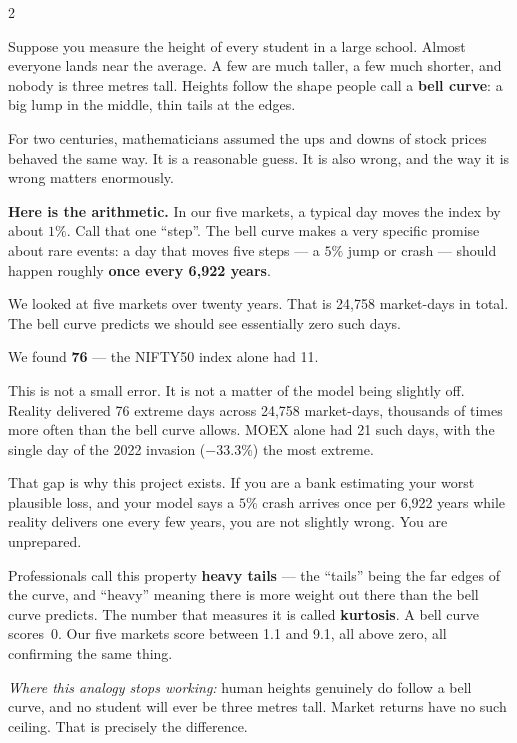 \documentclass[10pt]{article}
\newcommand{\redbox}[2]{\begin{tcolorbox}[mybox={DRed}{RBg},title={#1}]#2\end{tcolorbox}}
\begin{document}
\begin{multicols}{2}

\redbox{3\quad The Bell Curve Fails}{%
Suppose you measure the height of every student in a large school. Almost everyone lands near the average. A few are much taller, a few much shorter, and nobody is three metres tall. Heights follow the shape people call a \textbf{bell curve}: a big lump in the middle, thin tails at the edges.

For two centuries, mathematicians assumed the ups and downs of stock prices behaved the same way. It is a reasonable guess. It is also wrong, and the way it is wrong matters enormously.

\medskip
\textbf{Here is the arithmetic.} In our five markets, a typical day moves the index by about $1\%$. Call that one ``step''. The bell curve makes a very specific promise about rare events: a day that moves five steps --- a $5\%$ jump or crash --- should happen roughly \textbf{once every 6,922 years}.

We looked at five markets over twenty years. That is 24,758 market-days in total. The bell curve predicts we should see essentially zero such days.

\medskip
We found \textbf{76} --- the NIFTY50 index alone had 11.

\medskip
This is not a small error. It is not a matter of the model being slightly off. Reality delivered 76 extreme days across 24,758 market-days, thousands of times more often than the bell curve allows. MOEX alone had 21 such days, with the single day of the 2022 invasion ($-33.3\%$) the most extreme.

That gap is why this project exists. If you are a bank estimating your worst plausible loss, and your model says a $5\%$ crash arrives once per 6,922 years while reality delivers one every few years, you are not slightly wrong. You are unprepared.

Professionals call this property \textbf{heavy tails} --- the ``tails'' being the far edges of the curve, and ``heavy'' meaning there is more weight out there than the bell curve predicts. The number that measures it is called \textbf{kurtosis}. A bell curve scores~0. Our five markets score between 1.1 and 9.1, all above zero, all confirming the same thing.

\smallskip
\textit{Where this analogy stops working:} human heights genuinely do follow a bell curve, and no student will ever be three metres tall. Market returns have no such ceiling. That is precisely the difference.}


\end{multicols}
\end{document}
